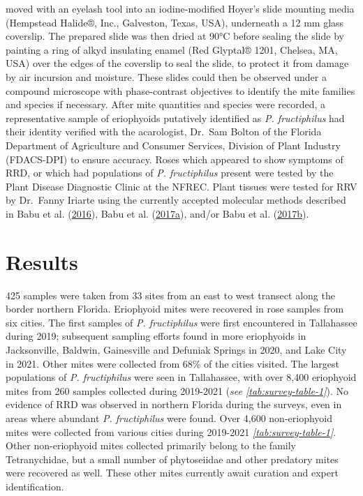 \documentclass{ufdissertation}[overrideChapters] %
\begin{document}
{moved with an eyelash tool into an iodine-modified Hoyer's slide mounting media (Hempstead Halide®, Inc., Galveston, Texas, USA), underneath a 12 \si{\milli\metre} glass coverslip. The prepared slide was then dried at 90°C before sealing the slide by painting a ring of alkyd insulating enamel (Red Glyptal® 1201, Chelsea, MA, USA) over the edges of the coverslip to seal the slide, to protect it from damage by air incursion and moisture. These slides could then be observed under a compound microscope with phase-contrast objectives to identify the mite families and species if necessary. After mite quantities and species were recorded, a representative sample of eriophyoids putatively identified as \emph{P. fructiphilus} had their identity verified with the acarologist, Dr.~Sam Bolton of the Florida Department of Agriculture and Consumer Services, Division of Plant Industry (FDACS-DPI) to ensure accuracy. Roses which appeared to show symptoms of RRD, or which had populations of \emph{P. fructiphilus} present were tested by the Plant Disease Diagnostic Clinic at the NFREC. Plant tissues were tested for RRV by Dr.~Fanny Iriarte using the currently accepted molecular methods described in Babu et al. (\protect\hyperlink{ref-Babu2016}{2016}), Babu et al. (\protect\hyperlink{ref-Babu2017a}{2017a}), and/or Babu et al. (\protect\hyperlink{ref-Babu2017b}{2017b}).

\hypertarget{results}{%
\section{Results}\label{results}}

425 samples were taken from 33 sites from an east to west transect along the border northern Florida. Eriophyoid mites were recovered in rose samples from six cities. The first samples of \emph{P. fructiphilus} were first encountered in Tallahassee during 2019; subsequent sampling efforts found in more eriophyoids in Jacksonville, Baldwin, Gainesville and Defuniak Springs in 2020, and Lake City in 2021. Other mites were collected from 68\% of the cities visited. The largest populations of \emph{P. fructiphilus} were seen in Tallahassee, with over 8,400 eriophyoid mites from 260 samples collected during 2019-2021 (\emph{see \ref{tab:survey-table-1}}). No evidence of RRD was observed in northern Florida during the surveys, even in areas where abundant \emph{P. fructiphilus} were found. Over 4,600 non-eriophyoid mites were collected from various cities during 2019-2021 \emph{\ref{tab:survey-table-1}}. Other non-eriophyoid mites collected primarily belong to the family Tetranychidae, but a small number of phytoseiidae and other predatory mites were recovered as well. These other mites currently await curation and expert identification.
\begin{figure}[p]


\end{figure}}
\end{document}
